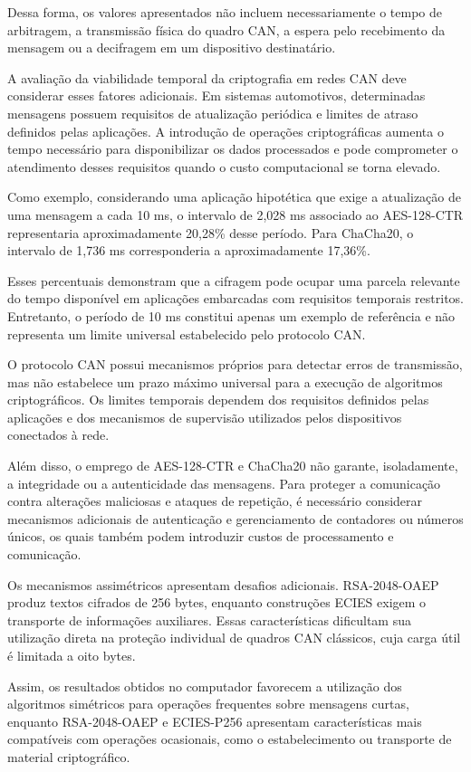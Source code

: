 Dessa forma, os valores apresentados não incluem necessariamente o tempo de arbitragem, a transmissão física do quadro CAN, a espera pelo recebimento da mensagem ou a decifragem em um dispositivo destinatário.

A avaliação da viabilidade temporal da criptografia em redes CAN deve considerar esses fatores adicionais. Em sistemas automotivos, determinadas mensagens possuem requisitos de atualização periódica e limites de atraso definidos pelas aplicações. A introdução de operações criptográficas aumenta o tempo necessário para disponibilizar os dados processados e pode comprometer o atendimento desses requisitos quando o custo computacional se torna elevado.

Como exemplo, considerando uma aplicação hipotética que exige a atualização de uma mensagem a cada 10 ms, o intervalo de 2,028 ms associado ao AES-128-CTR representaria aproximadamente 20,28\% desse período. Para ChaCha20, o intervalo de 1,736 ms corresponderia a aproximadamente 17,36\%.

Esses percentuais demonstram que a cifragem pode ocupar uma parcela relevante do tempo disponível em aplicações embarcadas com requisitos temporais restritos. Entretanto, o período de 10 ms constitui apenas um exemplo de referência e não representa um limite universal estabelecido pelo protocolo CAN.

O protocolo CAN possui mecanismos próprios para detectar erros de transmissão, mas não estabelece um prazo máximo universal para a execução de algoritmos criptográficos. Os limites temporais dependem dos requisitos definidos pelas aplicações e dos mecanismos de supervisão utilizados pelos dispositivos conectados à rede.

Além disso, o emprego de AES-128-CTR e ChaCha20 não garante, isoladamente, a integridade ou a autenticidade das mensagens. Para proteger a comunicação contra alterações maliciosas e ataques de repetição, é necessário considerar mecanismos adicionais de autenticação e gerenciamento de contadores ou números únicos, os quais também podem introduzir custos de processamento e comunicação.

Os mecanismos assimétricos apresentam desafios adicionais. RSA-2048-OAEP produz textos cifrados de 256 bytes, enquanto construções ECIES exigem o transporte de informações auxiliares. Essas características dificultam sua utilização direta na proteção individual de quadros CAN clássicos, cuja carga útil é limitada a oito bytes.

Assim, os resultados obtidos no computador favorecem a utilização dos algoritmos simétricos para operações frequentes sobre mensagens curtas, enquanto RSA-2048-OAEP e ECIES-P256 apresentam características mais compatíveis com operações ocasionais, como o estabelecimento ou transporte de material criptográfico.

